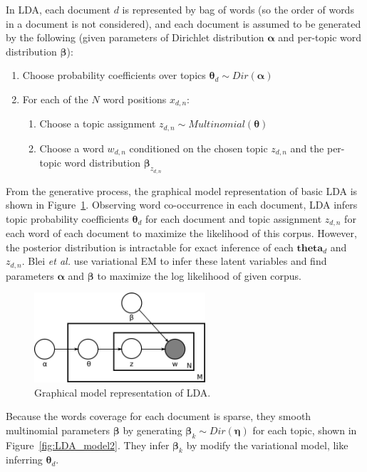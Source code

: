 In LDA, each document $d$ is represented by bag of words (so the order of words in a document is not considered), and each document is assumed to be generated by the following (given parameters of Dirichlet distribution $\boldsymbol{\alpha}$ and per-topic word distribution $\boldsymbol{\beta}$):
\begin{enumerate}[]
	\item Choose probability coefficients over topics $\boldsymbol{\theta}_d {\sim} Dir(\boldsymbol{\alpha})$
	\item For each of the $N$ word positions $x_{d,n}$:
	\begin{enumerate}
		\item Choose a topic assignment $z_{d,n} {\sim} Multinomial(\boldsymbol{\theta})$
		\item Choose a word $w_{d,n}$ conditioned on the chosen topic $z_{d,n}$ and the per-topic word distribution $\boldsymbol{\beta}_{z_{d,n}}$
	\end{enumerate}
\end{enumerate}

From the generative process, the graphical model representation of basic LDA is shown in Figure~\ref{fig:LDA_model}. Observing word co-occurrence in each document, LDA infers topic probability coefficients $\boldsymbol{\theta}_d$ for each document and topic assignment $z_{d,n}$ for each word of each document to maximize the likelihood of this corpus. However, the posterior distribution is intractable for exact inference of each $\boldsymbol{theta}_d$ and $z_{d,n}$. Blei {\it et al.} use variational EM to infer these latent variables and find parameters $\boldsymbol{\alpha}$ and $\boldsymbol{\beta}$ to maximize the log likelihood of given corpus.

\begin{figure}[!t]
\centering
\includegraphics[width=2.5in]{fig/LDA_model.jpg}
\caption{Graphical model representation of LDA.}
\label{fig:LDA_model}
\end{figure}

Because the words coverage for each document is sparse, they smooth multinomial parameters $\boldsymbol{\beta}$ by generating $\boldsymbol{\beta}_k \sim Dir(\boldsymbol{\eta})$ for each topic, shown in Figure~\ref{fig:LDA_model2}. They infer $\boldsymbol{\beta}_k$ by modify the variational model, like inferring $\boldsymbol{\theta}_d$.

